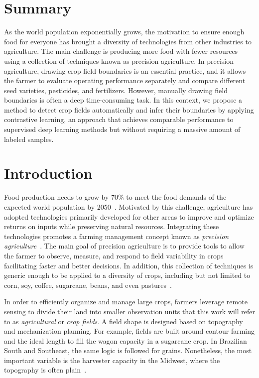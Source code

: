 \documentclass[12pt]{article}
\begin{document}
	\newpage
	\baselineskip
	\setcounter{page}{1}

\section*{Summary}

As the world population exponentially grows, the motivation to ensure enough food for everyone has brought a diversity of technologies from other industries to agriculture. The main challenge is producing more food with fewer resources using a collection of techniques known as precision agriculture. In precision agriculture, drawing crop field boundaries is an essential practice, and it allows the farmer to evaluate operating performance separately and compare different seed varieties, pesticides, and fertilizers. However, manually drawing field boundaries is often a deep time-consuming task. In this context, we propose a method to detect crop fields automatically and infer their boundaries by applying contrastive learning, an approach that achieves comparable performance to supervised deep learning methods but without requiring a massive amount of labeled samples.

\section{Introduction}\label{section:introduction}

Food production needs to grow by 70\% to meet the food demands of the expected world population by 2050~\cite{nelson2010}. Motivated by this challenge, agriculture has adopted technologies primarily developed for other areas to improve and optimize returns on inputs while preserving natural resources. Integrating these technologies promotes a farming management concept known as \textit{precision agriculture}~\cite{zhang2002}. The main goal of precision agriculture is to provide tools to allow the farmer to observe, measure, and respond to field variability in crops facilitating faster and better decisions. In addition, this collection of techniques is generic enough to be applied to a diversity of crops, including but not limited to corn, soy, coffee, sugarcane, beans, and even pastures~\cite{mulla2013,bhakta2019}.

In order to efficiently organize and manage large crops, farmers leverage remote sensing to divide their land into smaller observation units that this work will refer to as \textit{agricultural} or \textit{crop fields}. A field shape is designed based on topography and mechanization planning. For example, fields are built around contour farming and the ideal length to fill the wagon capacity in a sugarcane crop. In Brazilian South and Southeast, the same logic is followed for grains. Nonetheless, the most important variable is the harvester capacity in the Midwest, where the topography is often plain~\cite{spekken2015,griffel2019,bolfe2020}.
\end{document}
